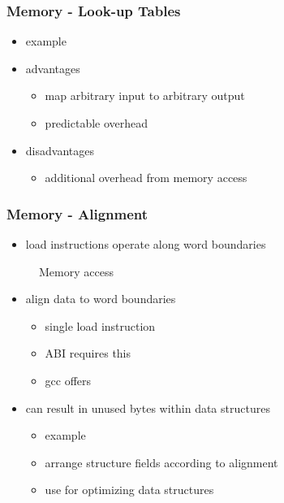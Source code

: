 \begin{frame}
 \frametitle{Memory - Look-up Tables}
 \begin{itemize}
  \item example 
  \item advantages
  \begin{itemize}
   \item map arbitrary input to arbitrary output
   \item predictable overhead
  \end{itemize}
  \item disadvantages
  \begin{itemize}
   \item additional overhead from memory access
  \end{itemize}
 \end{itemize}
\end{frame}

\begin{frame}
 \frametitle{Memory - Alignment}
 \begin{itemize}
  \item load instructions operate along word boundaries
 \end{itemize}

 \begin{figure}
  \caption{Memory access}
 \end{figure}

 \begin{itemize}
  \item align data to word boundaries
  \begin{itemize}
   \item single load instruction
   \item ABI requires this
   \item gcc offers 
  \end{itemize}
  \item can result in unused bytes within data structures
  \begin{itemize}
   \item example 
   \item arrange structure fields according to alignment
   \item use  for optimizing data structures
  \end{itemize}
 \end{itemize}
\end{frame}

